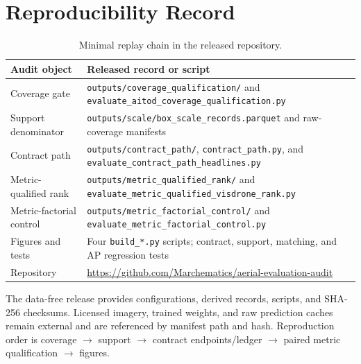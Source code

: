 \documentclass[journal]{IEEEtran}
\begin{document}
\section{Reproducibility Record}
\begin{table}[!t]
\centering
\caption{Minimal replay chain in the released repository.}\label{tab:repro}
\scriptsize
\setlength{\tabcolsep}{2.0pt}\renewcommand{\arraystretch}{1.03}
\begin{tabular}{p{}p{}}
\toprule
Audit object & Released record or script\\
\midrule
Coverage gate & \texttt{outputs/coverage\_qualification/} and \texttt{evaluate\_aitod\_coverage\_qualification.py}\\
Support denominator & \texttt{outputs/scale/box\_scale\_records.parquet} and raw-coverage manifests\\
Contract path & \texttt{outputs/contract\_path/}, \texttt{contract\_path.py}, and \texttt{evaluate\_contract\_path\_headlines.py}\\
Metric-qualified rank & \texttt{outputs/metric\_qualified\_rank/} and \texttt{evaluate\_metric\_qualified\_visdrone\_rank.py}\\
Metric-factorial control & \texttt{outputs/metric\_factorial\_control/} and \texttt{evaluate\_metric\_factorial\_control.py}\\
Figures and tests & Four \texttt{build\_*.py} scripts; contract, support, matching, and AP regression tests\\
Repository & \url{https://github.com/Marchematics/aerial-evaluation-audit}\\
\bottomrule
\end{tabular}
\end{table}

The data-free release provides configurations, derived records, scripts, and SHA-256 checksums. Licensed imagery, trained weights, and raw prediction caches remain external and are referenced by manifest path and hash. Reproduction order is coverage $\rightarrow$ support $\rightarrow$ contract endpoints/ledger $\rightarrow$ paired metric qualification $\rightarrow$ figures.
\end{document}
